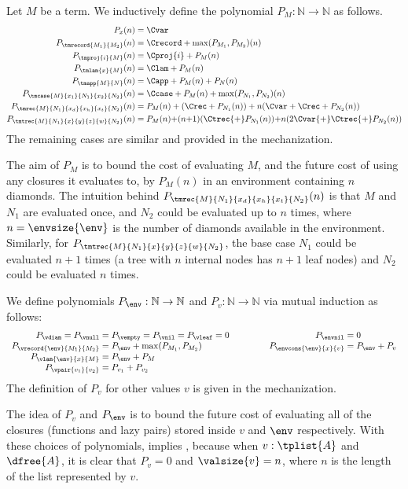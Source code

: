 \begin{definition}
Let $M$ be a \lfplplus term. We inductively define the polynomial $P_M : \mathbb N \to \mathbb N$ as follows.
{\upshape
\begin{align*}
P_{x}(n) &= \Cvar \\
P_{\tmrecord{M_1}{M_2}}(n) &= \Crecord + \max(P_{M_1}, P_{M_2})(n) \\
P_{\tmproj{i}{M}}(n) &= \Cproj{i} + P_M(n) \\
P_{\tmlam{x}{M}}(n) &= \Clam + P_M(n) \\
P_{\tmapp{M}{N}}(n) &= \Capp + P_M(n) + P_N(n) \\
P_{\tmcase{M}{x_1}{N_1}{x_2}{N_2}}(n) &= \Ccase + P_M(n) + \max(P_{N_1}, P_{N_2})(n) \\
P_{\tmrec{M}{N_1}{x_d}{x_h}{x_t}{N_2}}(n) &= P_M(n) + (\Crec + P_{N_1}(n)) 
 + n (\Cvar + \Crec + P_{N_2}(n)) \\
P_{\tmtrec{M}{N_1}{x}{y}{z}{w}{N_2}}(n) &= P_M(n) {+} (n {+} 1) (\Ctrec {+} P_{N_1}(n)) 
 {+} n (2\Cvar {+} \Ctrec {+} P_{N_2}(n))
\end{align*}
}
The remaining cases are similar and provided in the mechanization.
\end{definition}

The aim of $P_M$ is to bound the cost of evaluating $M$, and the future cost of using any closures it evaluates to, by $P_M(n)$ in an environment containing $n$ diamonds. The intuition behind $P_{\tmrec{M}{N_1}{x_d}{x_h}{x_t}{N_2}}(n)$ is that $M$ and $N_1$ are evaluated once, and $N_2$ could be evaluated up to $n$ times, where $n = \envsize{\env}$ is the number of diamonds available in the environment. Similarly, for $P_{\tmtrec{M}{N_1}{x}{y}{z}{w}{N_2}}$, the base case $N_1$ could be evaluated $n + 1$ times (a tree with $n$ internal nodes has $n + 1$ leaf nodes) and $N_2$ could be evaluated $n$ times.

\begin{definition}
We define polynomials $P_\env : \mathbb N \to \mathbb N$ and $P_v : \mathbb N \to \mathbb N$ via mutual induction as follows:
\[
\begin{array}{r@{\;=\;}l@{\hspace{4.5em}}r@{\;=\;}l}
  P_{\vdiam} = P_{\vnull} & P_{\vempty} = P_{\vnil} = P_{\vleaf} = 0 &
  P_{\envnil} & 0 \\
 P_{\vrecord{\env}{M_1}{M_2}} & P_{\env} + \max(P_{M_1}, P_{M_2}) &
  P_{\envcons{\env}{x}{v}} & P_\env + P_v \\
P_{\vlam{\env}{x}{M}} & P_{\env} + P_M \\
P_{\vpair{v_1}{v_2}} & P_{v_1} + P_{v_2} 
\end{array}
\]
The definition of $P_v$ for other values $v$ is given in the mechanization.
\end{definition}
The idea of  $P_v$ and $P_\env$ is to bound the future cost of evaluating all of the closures (functions and lazy pairs) stored inside $v$ and $\env$ respectively. With these choices of polynomials,  implies , because when $v : \tplist{A}$ and $\dfree{A}$, it is clear that $P_v = 0$ and $\valsize{v} = n$, where $n$ is the length of the list represented by $v$.

